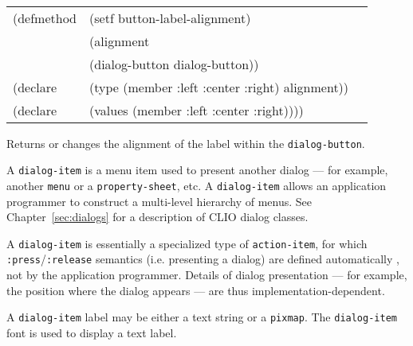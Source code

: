 \begin{flushright} \parbox[t]{6.125in}{
\tt
\begin{tabular}{lll}
\raggedright
(defmethod & (setf button-label-alignment) & \\
         & (alignment \\
         & (dialog-button  dialog-button)) \\
(declare &(type (member :left :center :right)  alignment))\\
(declare & (values (member :left :center :right))))
\end{tabular}
\rm}
\end{flushright}

\begin{flushright} \parbox[t]{6.125in}{
Returns or changes the alignment of the label within the {\tt dialog-button}.}
\end{flushright}





\vfill\pagebreak
  


A {\tt dialog-item} is a menu item used to present another dialog --- for
example, another {\tt menu} or a {\tt property-sheet}, etc. 
A {\tt dialog-item} allows an application programmer to construct a multi-level
hierarchy of menus. See Chapter~\ref{sec:dialogs} for a description of CLIO dialog
classes.

A {\tt dialog-item} is essentially a specialized type of {\tt action-item}, for
which {\tt :press}/{\tt :release} semantics (i.e. presenting a dialog) are defined
automatically , not by the application programmer.  Details of dialog presentation
--- for example, the position where the dialog appears --- are thus
implementation-dependent.

A {\tt dialog-item} label may be either a text string or a {\tt pixmap}.
The {\tt dialog-item} font is used to display a text label.


